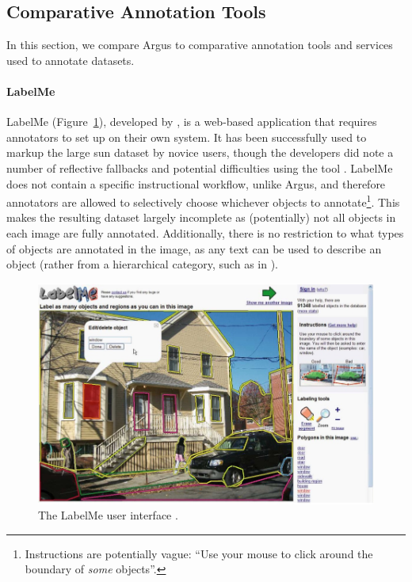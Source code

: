 


\subsection{Comparative Annotation Tools}
\label{sec:dataset:metamodel_evaluation:tools}

In this section, we compare Argus to comparative annotation tools  and services used to annotate datasets.

\paragraph{LabelMe} 

LabelMe (Figure~\ref{}), developed by \citet{Russell:2008wm}, is a web-based application that requires annotators to set up on their own system. It has been successfully used to markup the large \gls{sun} dataset by novice users, though the developers did note a number of reflective fallbacks and potential difficulties using the tool \citep{DBLP:journals/corr/abs-1210-3448}. LabelMe does not contain a specific instructional workflow, unlike Argus, and therefore annotators are allowed to selectively choose whichever objects to annotate\footnote{Instructions are potentially vague: ``Use your mouse to click around the boundary of \textit{some} objects''.}. This makes the resulting dataset largely incomplete as (potentially) not all objects in each image are fully annotated. Additionally, there is no restriction to what types of objects are annotated in the image, as any text can be used to describe an object (rather from a hierarchical category, such as in \citep{Lin:2014vma}).

\begin{figure}[t]
  \includegraphics[width=\textwidth]{images/dataset/tools/label_me}
  \caption[The LabelMe user interface]{The LabelMe user interface \citep{Russell:2008wm}.}
  \label{}
\end{figure}

